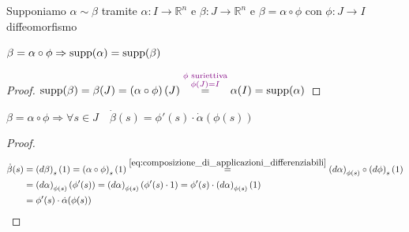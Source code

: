         \begin{osservazione}
        Supponiamo $\alpha \sim \beta$ tramite $\alpha : I \to \mathbb{R}^n$ e $\beta: J \to \mathbb{R}^n$ e $\beta = \alpha \circ \phi$ con $\phi: J \to I$ diffeomorfismo

        $\beta = \alpha \circ \phi \Rightarrow \operatorname{supp} (\alpha) = \operatorname{supp}(\beta)$
        \begin{proof}
        $\operatorname{supp}(\beta)= \beta(J)= \left(\alpha \circ \phi \right)(J) \overset{\textcolor{violet}{ \substack{\phi \text{ suriettiva} \\ \phi(J) = I }}}{=} \alpha(I)= \operatorname{supp}(\alpha)$
        \end{proof}
        $\beta = \alpha \circ \phi \Rightarrow \forall s \in J \quad \dot{\beta}(s) = \phi'(s) \cdot \dot{\alpha}(\phi(s)) $
        \begin{proof}
        \begin{align*}
        \dot{\beta}(s) &= \left( d \beta \right)_s (1) = \left( \alpha \circ \phi \right)_s (1) \overset{\eqref{eq:composizione_di_applicazioni_differenziabili}}{=} \left(d\alpha\right)_{\phi(s)} \circ \left(d\phi\right)_s (1) \\
        &= \left(d\alpha\right)_{\phi(s)} \left( \phi'(s) \right)  = \left(d\alpha\right)_{\phi(s)} \left( \phi'(s) \cdot 1 \right) = \phi'(s) \cdot \left(d\alpha\right)_{\phi(s)} (1)  \\
        &= \phi'(s) \cdot \dot{\alpha}(\phi(s)) 
        \end{align*}
        \end{proof}
        \end{osservazione}
